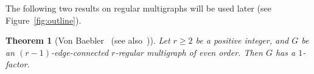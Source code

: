 \documentclass[12pt,reqno,a4paper]{amsart}
\newtheorem{theorem}{Theorem}[section]
\begin{document}
	




The following two results on regular multigraphs will be used
  later (see Figure~\ref{fig:outline}).



\begin{theorem}[Von Baebler~\cite{Ba37} (see also~{\cite[Theorem 
2.37]{AkKa11}})]\label{thm:Kano}
Let $r \geq 2$ be a positive integer, and $G$ be an $(r-1)$-edge-connected 
$r$-regular multigraph of even order. Then $G$ has a $1$-factor. 
\end{theorem}
\end{document}
